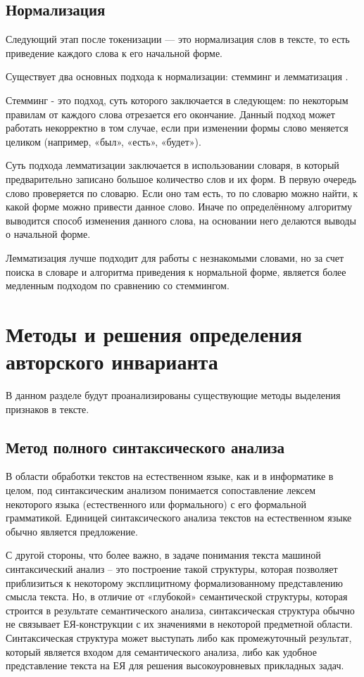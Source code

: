 \subsection{Нормализация}

Следующий этап после токенизации — это нормализация слов в тексте, то есть приведение каждого слова к его начальной форме. 

Существует два основных подхода к нормализации: стемминг и лемматизация  \cite{tutorial}.

Стемминг - это подход, суть которого заключается в следующем: по некоторым правилам от каждого слова отрезается его окончание. Данный подход может работать некорректно в том случае, если при изменении формы слово меняется целиком (например, «был», «есть», «будет»).

Суть подхода лемматизации заключается в  использовании словаря, в который предварительно записано большое количество слов и их форм. В первую очередь слово проверяется по словарю. Если оно там есть, то по словарю можно найти, к какой форме можно привести данное слово. Иначе по определённому алгоритму выводится способ изменения данного слова, на основании него делаются выводы о начальной форме.

Лемматизация лучше подходит для работы с незнакомыми словами, но за счет поиска в словаре и алгоритма приведения к нормальной форме, является более медленным подходом по сравнению со стеммингом.


\section{Методы и решения определения авторского инварианта}

В данном разделе будут проанализированы существующие методы выделения признаков в тексте.

\subsection{Метод полного синтаксического анализа}

В области обработки текстов на естественном языке, как и в информатике в целом, под синтаксическим анализом понимается сопоставление лексем некоторого языка (естественного или формального) с его формальной грамматикой. Единицей синтаксического анализа текстов на естественном языке обычно является предложение.

С другой стороны, что более важно, в задаче понимания текста машиной синтаксический анализ – это построение такой структуры, которая позволяет приблизиться к некоторому эксплицитному формализованному представлению смысла текста. Но, в отличие от «глубокой» семантической структуры, которая строится в результате семантического анализа, синтаксическая структура обычно не связывает ЕЯ-конструкции с их значениями в некоторой предметной области. Синтаксическая структура может выступать либо как промежуточный результат, который является входом для семантического анализа, либо как удобное представление текста на ЕЯ для решения высокоуровневых прикладных задач.

